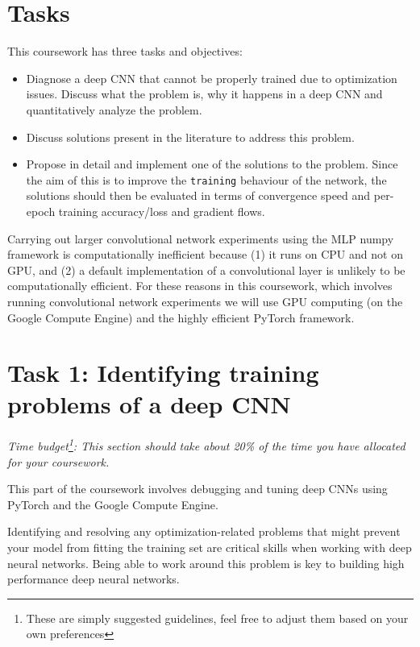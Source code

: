 \documentclass[11pt,]{article}
\begin{document}
\section{Tasks}
\label{sec:tasks}

This coursework has three tasks and objectives: 
\begin{itemize}
    \item Diagnose a deep CNN that cannot be properly trained due to optimization issues. Discuss what the problem is, why it happens in a deep CNN and quantitatively analyze the problem. 
    \item Discuss solutions present in the literature to address this problem.  
    \item Propose in detail and implement one of the solutions to the problem. Since the aim of this is to improve the \texttt{training} behaviour of the network, the solutions should then be evaluated in terms of {convergence speed} and {per-epoch training accuracy/loss} and {gradient flows}.
\end{itemize}

Carrying out larger convolutional network experiments using the MLP numpy framework is computationally inefficient because (1) it runs on CPU and not on GPU, and (2) a  default implementation of a convolutional layer is unlikely to be computationally efficient. For these reasons in this coursework, which involves running convolutional network experiments we will use GPU computing (on the Google Compute Engine) and the highly efficient PyTorch framework.



\section{Task 1: Identifying training problems of a deep CNN}
\label{sec:pytorch}
\textit{Time budget\footnote{\label{footnote:time-budget} These are simply suggested guidelines, feel free to adjust them based on your own preferences}: This section should take about 20\% of the time you have allocated for your coursework.}\newline

This part of the coursework involves debugging and tuning deep CNNs using PyTorch and the Google Compute Engine.

Identifying and resolving any optimization-related problems that might prevent your model from fitting the training set are critical skills when working with deep neural networks. Being able to work around this problem is key to building high performance deep neural networks.
\end{document}

